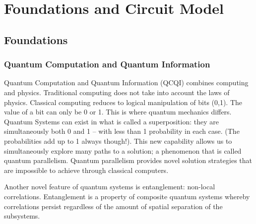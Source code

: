 \documentclass[12pt, a4paper, oneside]{report}
\theoremstyle{plain}
\theoremstyle{definition}
\theoremstyle{remark}
\begin{document}
\clearpage
\tableofcontents

\clearpage
\listoftables
{}
\listoffigures
{}

\clearpage
{}
\setcounter{page}{1}

\part{Foundations and Circuit Model}

\chapter{Foundations}
\label{ch:foundations}

\section{Quantum Computation and Quantum Information}

Quantum Computation and Quantum Information (QCQI) combines computing and physics. Traditional computing does not take into account the laws of physics. Classical computing reduces to logical manipulation of bits (0,1). The value of a bit can only be 0 or 1. This is where quantum mechanics differs. Quantum Systems can exist in what is called a superposition: they are simultaneously both 0 and 1 -- with less than 1 probability in each case. (The probabilities add up to 1 always though!). This new capability allows us to simultaneously explore many paths to a solution; a phenomenon that is called quantum parallelism. Quantum parallelism provides novel solution strategies that are impossible to achieve through classical computers.

Another novel feature of quantum systems is entanglement: non-local correlations. Entanglement is a property of composite quantum systems whereby correlations persist regardless of the amount of spatial separation of the subsystems.
\end{document}
